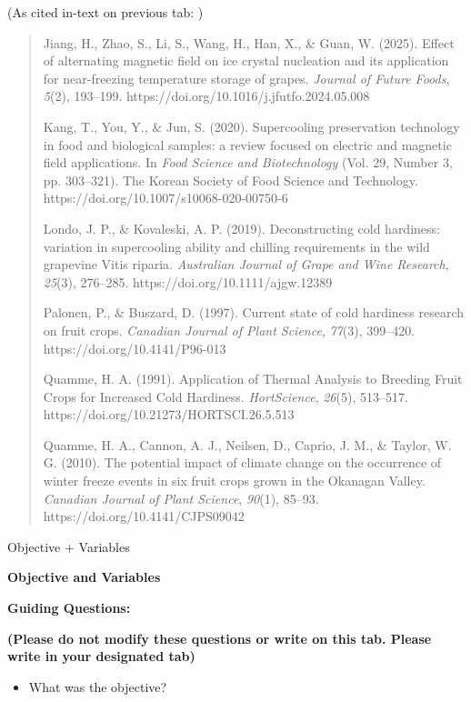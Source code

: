 (As cited in-text on previous tab: )

\begin{quote}
Jiang, H., Zhao, S., Li, S., Wang, H., Han, X., \& Guan, W. (2025).
Effect of alternating magnetic field on ice crystal nucleation and its
application for near-freezing temperature storage of grapes.
\emph{Journal of Future Foods}, \emph{5}(2), 193--199.
https://doi.org/10.1016/j.jfutfo.2024.05.008

Kang, T., You, Y., \& Jun, S. (2020). Supercooling preservation
technology in food and biological samples: a review focused on electric
and magnetic field applications. In \emph{Food Science and
Biotechnology} (Vol. 29, Number 3, pp. 303--321). The Korean Society of
Food Science and Technology. https://doi.org/10.1007/s10068-020-00750-6

Londo, J. P., \& Kovaleski, A. P. (2019). Deconstructing cold hardiness:
variation in supercooling ability and chilling requirements in the wild
grapevine Vitis riparia. \emph{Australian Journal of Grape and Wine
Research}, \emph{25}(3), 276--285. https://doi.org/10.1111/ajgw.12389

Palonen, P., \& Buszard, D. (1997). Current state of cold hardiness
research on fruit crops. \emph{Canadian Journal of Plant Science},
\emph{77}(3), 399--420. https://doi.org/10.4141/P96-013

Quamme, H. A. (1991). Application of Thermal Analysis to Breeding Fruit
Crops for Increased Cold Hardiness. \emph{HortScience}, \emph{26}(5),
513--517. https://doi.org/10.21273/HORTSCI.26.5.513

Quamme, H. A., Cannon, A. J., Neilsen, D., Caprio, J. M., \& Taylor, W.
G. (2010). The potential impact of climate change on the occurrence of
winter freeze events in six fruit crops grown in the Okanagan Valley.
\emph{Canadian Journal of Plant Science}, \emph{90}(1), 85--93.
https://doi.org/10.4141/CJPS09042
\end{quote}

Objective + Variables

\textbf{Objective and Variables}

\textbf{Guiding Questions:}

\textbf{(Please do not modify these questions or write on this tab.
Please write in your designated tab)}

\begin{itemize}
\item
  What was the objective?
\end{itemize}

